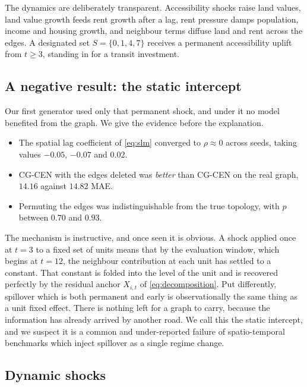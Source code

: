 \documentclass[journal]{IEEEtran}
\newcommand{\CGCEN}{CG\mbox{-}CEN}
\begin{document}
The dynamics are deliberately transparent. Accessibility shocks raise land
values, land value growth feeds rent growth after a lag, rent pressure damps
population, income and housing growth, and neighbour terms diffuse land and rent
across the edges. A designated set $S = \{0,1,4,7\}$ receives a permanent
accessibility uplift from $t \ge 3$, standing in for a transit investment.

\subsection{A negative result: the static intercept}
\label{subsec:collapse}

Our first generator used only that permanent shock, and under it no model
benefited from the graph. We give the evidence before the explanation.

\begin{itemize}
\item[--] The spatial lag coefficient of \eqref{eq:slm} converged to
$\rho \approx 0$ across seeds, taking values $-0.05$, $-0.07$ and $0.02$.
\item[--] \CGCEN{} with the edges deleted was \emph{better} than \CGCEN{} on the
real graph, $14.16$ against $14.82$ MAE.
\item[--] Permuting the edges was indistinguishable from the true topology,
with $p$ between $0.70$ and $0.93$.
\end{itemize}

The mechanism is instructive, and once seen it is obvious. A shock applied once
at $t = 3$ to a fixed set of units means that by the evaluation window, which
begins at $t = 12$, the neighbour contribution at each unit has settled to a
constant. That constant is folded into the level of the unit and is recovered
perfectly by the residual anchor $X_{i,t}$ of \eqref{eq:decomposition}. Put
differently, spillover which is both permanent and early is observationally the
same thing as a unit fixed effect. There is nothing left for a graph to carry,
because the information has already arrived by another road. We call this the
static intercept, and we suspect it is a common and under-reported failure of
spatio-temporal benchmarks which inject spillover as a single regime change.

\subsection{Dynamic shocks}
\end{document}
